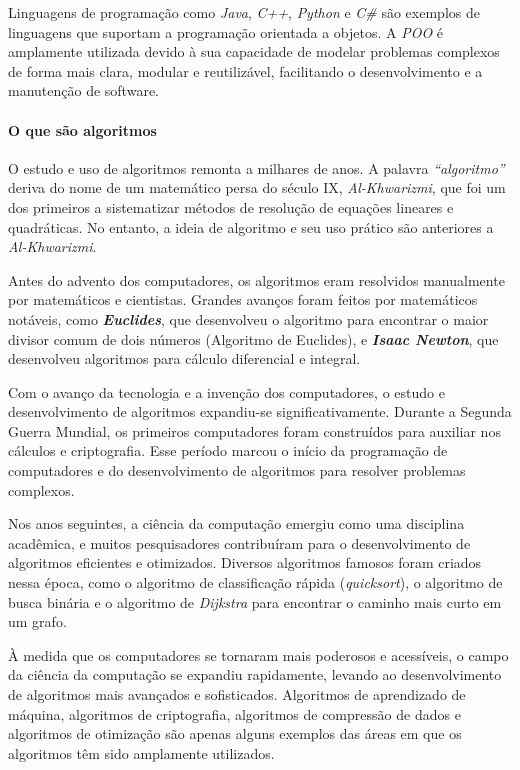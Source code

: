 \documentclass[a4paper, 12pt, onecolumn,singlespacing]{article}
\begin{document}
	Linguagens de programação como \textit{Java}, \textit{C++}, \textit{Python} e \textit{C\#} são exemplos de linguagens que suportam a programação orientada a objetos. A \textit{POO} é amplamente utilizada devido à sua capacidade de modelar problemas complexos de forma mais clara, modular e reutilizável, facilitando o desenvolvimento e a manutenção de software.
	
	\paragraph{O que são algoritmos} O estudo e uso de algoritmos remonta a milhares de anos. A palavra \textit{``algoritmo''} deriva do nome de um matemático persa do século IX, \textit{Al-Khwarizmi}, que foi um dos primeiros a sistematizar métodos de resolução de equações lineares e quadráticas. No entanto, a ideia de algoritmo e seu uso prático são anteriores a \textit{Al-Khwarizmi}.
	
	Antes do advento dos computadores, os algoritmos eram resolvidos manualmente por matemáticos e cientistas. Grandes avanços foram feitos por matemáticos notáveis, como \textit{\textbf{Euclides}}, que desenvolveu o algoritmo para encontrar o maior divisor comum de dois números (Algoritmo de Euclides), e \textbf{\textit{\textit{Isaac Newton}}}, que desenvolveu algoritmos para cálculo diferencial e integral.
	
	Com o avanço da tecnologia e a invenção dos computadores, o estudo e desenvolvimento de algoritmos expandiu-se significativamente. Durante a Segunda Guerra Mundial, os primeiros computadores foram construídos para auxiliar nos cálculos e criptografia. Esse período marcou o início da programação de computadores e do desenvolvimento de algoritmos para resolver problemas complexos.
	
	Nos anos seguintes, a ciência da computação emergiu como uma disciplina acadêmica, e muitos pesquisadores contribuíram para o desenvolvimento de algoritmos eficientes e otimizados. Diversos algoritmos famosos foram criados nessa época, como o algoritmo de classificação rápida (\textit{quicksort}), o algoritmo de busca binária e o algoritmo de \textit{Dijkstra\textbf{}} para encontrar o caminho mais curto em um grafo.
	
	À medida que os computadores se tornaram mais poderosos e acessíveis, o campo da ciência da computação se expandiu rapidamente, levando ao desenvolvimento de algoritmos mais avançados e sofisticados. Algoritmos de aprendizado de máquina, algoritmos de criptografia, algoritmos de compressão de dados e algoritmos de otimização são apenas alguns exemplos das áreas em que os algoritmos têm sido amplamente utilizados.
	
\end{document}
